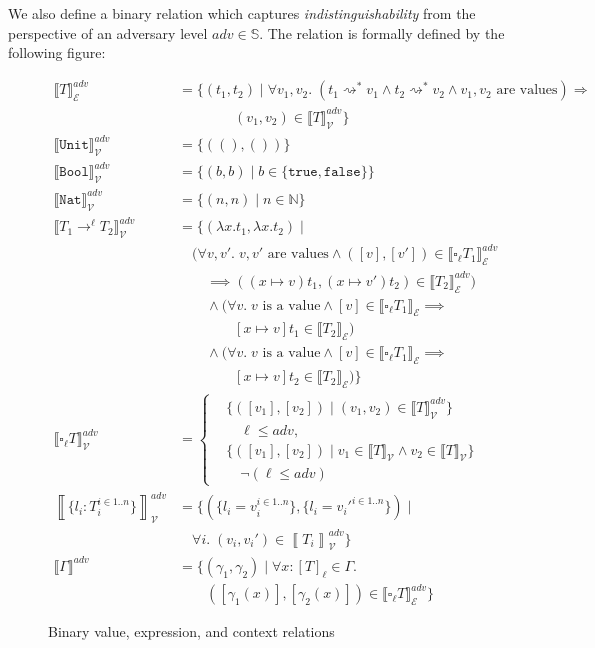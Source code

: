 \documentclass[conference]{IEEEtran}
\newcommand\gradedt[2]{\square_{#1} #2}
\newcommand\secure{\mathbb{S}}
\newcommand\true{\texttt{true}}
\newcommand\false{\texttt{false}}
\newcommand\bool{\texttt{Bool}}
\newcommand\nat{\texttt{Nat}}
\newcommand\unt{()}
\newcommand\untt{\texttt{Unit}}
\newcommand\calv{\mathcal{V}}
\newcommand\cale{\mathcal{E}}
\newcommand\bbrac[1]{\left\llbracket #1\right\rrbracket}
\begin{document}
We also define a binary relation which captures \emph{indistinguishability} from the perspective of an adversary level $adv\in\secure$. The relation is formally defined by the following figure:

\begin{figure}[H]
	\centering
	\small
	$$
	\begin{aligned}
		\llbracket T\rrbracket^{adv}_\cale &= \{(t_1,t_2)\mid \forall v_1,v_2.\;(t_1\rightsquigarrow^* v_1\wedge t_2\rightsquigarrow^* v_2\wedge v_1,v_2\text{ are values})\Rightarrow\\
		&\qquad\qquad (v_1,v_2)\in\llbracket T\rrbracket^{adv}_\calv\}\\
		\llbracket\untt\rrbracket^{adv}_\calv &= \{(\unt,\unt)\}\\
		\llbracket\bool\rrbracket^{adv}_\calv &= \{(b,b)\mid b\in\{\true,\false\}\}\\
		\llbracket\nat\rrbracket^{adv}_\calv &= \{(n,n)\mid n\in\mathbb N\}\\
		\llbracket T_1\to^\ell T_2\rrbracket^{adv}_\calv &=
		\{(\lambda x.t_1,\lambda x.t_2)\mid\\
		&\quad(\forall v,v'.\;v,v'\text{ are values}\wedge([v],[v'])\in\llbracket \gradedt{\ell}{T_1}\rrbracket^{adv}_\cale\\
		&\qquad\implies ((x\mapsto v)t_1,(x\mapsto v')t_2)\in\llbracket T_2\rrbracket^{adv}_\cale)\\
		&\qquad\wedge(\forall v.\;v\text{ is a value}\wedge[v]\in\llbracket\gradedt{\ell}{T_1}\rrbracket_\cale\implies\\ &\qquad\qquad[x\mapsto v]t_1\in\llbracket T_2\rrbracket_\cale)\\
		&\qquad\wedge(\forall v.\;v\text{ is a value}\wedge[v]\in\llbracket\gradedt{\ell}{T_1}\rrbracket_\cale\implies\\ &\qquad\qquad[x\mapsto v]t_2\in\llbracket T_2\rrbracket_\cale)\}\\
		\llbracket\gradedt{\ell}{T}\rrbracket^{adv}_\calv &= \left\{\begin{aligned}
			&\{([v_1],[v_2])\mid (v_1,v_2)\in\llbracket T\rrbracket^{adv}_\calv\}\\&\quad\ell\le adv,\\
			&\{([v_1],[v_2])\mid v_1\in\llbracket T\rrbracket_\calv\wedge v_2\in\llbracket T\rrbracket_\calv\}\\&\quad\neg(\ell\le adv)
		\end{aligned}\right.\\
		\bbrac{\{l_i:T_i^{i\in 1..n}\}}^{adv}_\calv &= \{(\{l_i=v_i^{i\in 1..n}\},\{l_i=v_i'^{i\in 1..n}\})\mid\\
		&\quad\forall i.\;(v_i,v_i')\in\bbrac{T_i}^{adv}_\calv\}\\
		\llbracket\Gamma\rrbracket^{adv}&=\{(\gamma_1,\gamma_2)\mid\forall x:[T]_\ell\in\Gamma.\\
		&\qquad([\gamma_1(x)],[\gamma_2(x)])\in\llbracket\gradedt{\ell}{T}\rrbracket^{adv}_\cale\}
	\end{aligned}
	$$
	\normalsize
	\caption{Binary value, expression, and context relations}
\end{figure}
\end{document}
